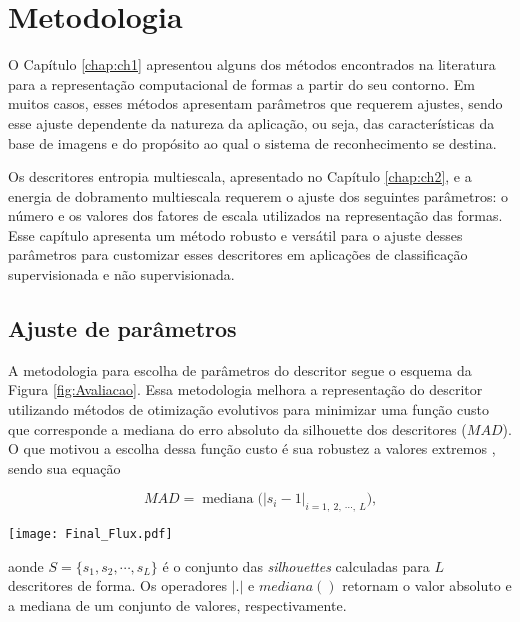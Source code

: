 \chapter{Metodologia}
\label{chap:MatMet}

O Capítulo \ref{chap:ch1} apresentou alguns dos métodos encontrados na literatura para a representação computacional de formas a partir do seu contorno.  Em muitos casos, esses métodos apresentam parâmetros que requerem ajustes, sendo esse ajuste dependente da natureza da aplicação, ou seja,  das características da base de imagens e do propósito ao qual o sistema de reconhecimento se destina.

Os descritores entropia multiescala, apresentado no Capítulo \ref{chap:ch2}, e a energia de dobramento multiescala requerem o ajuste dos seguintes parâmetros: o número e os valores dos fatores de escala utilizados na representação das formas. Esse capítulo apresenta um método robusto e versátil para o ajuste desses parâmetros para customizar esses descritores em aplicações de classificação supervisionada e não supervisionada.   
 

\section{Ajuste de parâmetros}
A metodologia para escolha de parâmetros do descritor segue o esquema da Figura \ref{fig:Avaliacao}. Essa metodologia melhora a representação do descritor utilizando métodos de otimização evolutivos para minimizar uma função custo que corresponde a mediana do erro absoluto da silhouette dos descritores ($MAD$). O que motivou a escolha dessa função custo é sua robustez a valores extremos \cite{Rousseeuw:1987:2}, sendo sua equação 

\begin{equation}
\label{eq:mad}
MAD = \operatorname{mediana}\big(|s_i - 1|_{i =1,\:2,\:\cdots,\:L}\big)\text{,}
\end{equation}

\begin{figure*}[ht]
\centering
\texttt{[image: Final\_Flux.pdf]}
\caption{The proposed approach for evolutionary optimization of a multiscale shape descriptor.} 
\label{fig:Avaliacao}
\end{figure*}

\noindent aonde $S = \{s_1,s_2,\cdots,s_L\}$ é o conjunto das \emph{silhouettes} calculadas para $L$ descritores de forma. Os operadores $|.|$  e {$mediana ( )$} retornam o valor absoluto e a mediana de um conjunto de valores, respectivamente.

